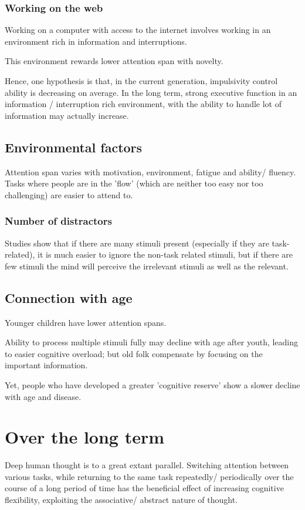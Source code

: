 \documentclass[oneside, article]{memoir}
\begin{document}
\subsubsection{Working on the web}
Working on a computer with access to the internet involves working in an environment rich in information and interruptions.

This environment rewards lower attention span with novelty. 

Hence, one hypothesis is that, in the current generation, impulsivity control ability is decreasing on average. In the long term, strong executive function in an information / interruption rich environment, with the ability to handle lot of information may actually increase.

\subsection{Environmental factors}
Attention span varies with motivation, environment, fatigue and ability/ fluency. Tasks where people are in the 'flow' (which are neither too easy nor too challenging) are easier to attend to.

\subsubsection{Number of distractors}
Studies show that if there are many stimuli present (especially if they are task-related), it is much easier to ignore the non-task related stimuli, but if there are few stimuli the mind will perceive the irrelevant stimuli as well as the relevant.


\subsection{Connection with age}
Younger children have lower attention spans.

Ability to process multiple stimuli fully may decline with age after youth, leading to easier cognitive overload; but old folk compensate by focusing on the important information. \chk

Yet, people who have developed a greater 'cognitive reserve' show a slower decline with age and disease.

\section{Over the long term}
Deep human thought is to a great extant parallel. Switching attention between various tasks, while returning to the same task repeatedly/ periodically over the course of a long period of time has the beneficial effect of increasing cognitive flexibility, exploiting the associative/ abstract nature of thought.
\end{document}
